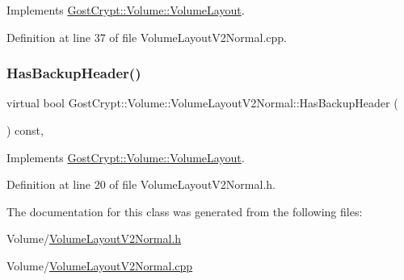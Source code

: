 Implements \hyperlink{class_gost_crypt_1_1_volume_1_1_volume_layout_a55eb89c0c90553250e50138c990bbfac}{Gost\+Crypt\+::\+Volume\+::\+Volume\+Layout}.



Definition at line 37 of file Volume\+Layout\+V2\+Normal.\+cpp.

\mbox{\label{class_gost_crypt_1_1_volume_1_1_volume_layout_v2_normal_a18a75c3663f6922e890dca6825c0b580}} 
\subsubsection{\texorpdfstring{Has\+Backup\+Header()}{HasBackupHeader()}}
{\footnotesize\ttfamily virtual bool Gost\+Crypt\+::\+Volume\+::\+Volume\+Layout\+V2\+Normal\+::\+Has\+Backup\+Header (\begin{DoxyParamCaption}{ }\end{DoxyParamCaption}) const\hspace{0.3cm}{\ttfamily [inline]}, {\ttfamily [virtual]}}



Implements \hyperlink{class_gost_crypt_1_1_volume_1_1_volume_layout_a4f88c450f745ca0da3d74700b89d5756}{Gost\+Crypt\+::\+Volume\+::\+Volume\+Layout}.



Definition at line 20 of file Volume\+Layout\+V2\+Normal.\+h.



The documentation for this class was generated from the following files\+:\begin{DoxyCompactItemize}
\item 
Volume/\hyperlink{_volume_layout_v2_normal_8h}{Volume\+Layout\+V2\+Normal.\+h}\item 
Volume/\hyperlink{_volume_layout_v2_normal_8cpp}{Volume\+Layout\+V2\+Normal.\+cpp}\end{DoxyCompactItemize}
